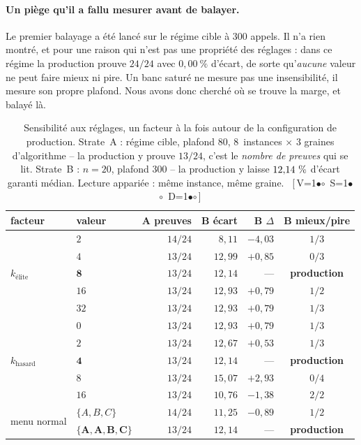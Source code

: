 \documentclass[11pt,a4paper]{article}
\theoremstyle{plain}
\theoremstyle{remark}
\newcommand{\cfgm}[1]{\ifnum#1=1$\bullet$\else$\circ$\fi}
\newcommand{\conf}[3]{%
  \textsf{\footnotesize[\,V\cfgm{#1}\ S\cfgm{#2}\ D\cfgm{#3}\,]}}
\begin{document}
\paragraph{Un piège qu'il a fallu mesurer avant de balayer.} Le premier
balayage a été lancé sur le régime cible à $300$ appels. Il n'a rien montré,
et pour une raison qui n'est pas une propriété des réglages : dans ce régime
la production prouve $24/24$ avec $0{,}00\ \%$ d'écart, de sorte
qu'\emph{aucune} valeur ne peut faire mieux ni pire. Un banc saturé ne
mesure pas une insensibilité, il mesure son propre plafond. Nous avons donc
cherché où se trouve la marge, et balayé là.

\begin{table}[H]
\centering
\caption{Sensibilité aux réglages, un facteur à la fois autour de la
configuration de production. Strate~A : régime cible, plafond $80$,
$8$~instances $\times$ $3$ graines d'algorithme -- la production y prouve
$13/24$, c'est le \emph{nombre de preuves} qui se lit. Strate~B : $n=20$,
plafond $300$ -- la production y laisse $12{,}14{}\ \%$ d'écart garanti
médian. Lecture appariée : même instance, même graine.\ \conf{1}{1}{1}}
\label{tab:sensib}
\setlength{\tabcolsep}{4pt}\small
\begin{tabular}{llrrrc}
\toprule
facteur & valeur & A preuves & B écart & B $\Delta$ & B mieux/pire\\
\midrule
\multirow{5}{*}{$k_{\text{élite}}$}
 & $2$ & $14/24$ & $8{,}11$ & $-4{,}03$ & $1/3$\\
 & $4$ & $13/24$ & $12{,}99$ & $+0{,}85$ & $0/3$\\
 & $\mathbf{8}$ & $13/24$ & $12{,}14$ & --- & \textbf{production}\\
 & $16$ & $13/24$ & $12{,}93$ & $+0{,}79$ & $1/2$\\
 & $32$ & $13/24$ & $12{,}93$ & $+0{,}79$ & $1/3$\\
\midrule
\multirow{5}{*}{$k_{\text{hasard}}$}
 & $0$ & $13/24$ & $12{,}93$ & $+0{,}79$ & $1/3$\\
 & $2$ & $13/24$ & $12{,}67$ & $+0{,}53$ & $1/3$\\
 & $\mathbf{4}$ & $13/24$ & $12{,}14$ & --- & \textbf{production}\\
 & $8$ & $13/24$ & $15{,}07$ & $+2{,}93$ & $0/4$\\
 & $16$ & $13/24$ & $10{,}76$ & $-1{,}38$ & $2/2$\\
\midrule
\multirow{5}{*}{menu normal}
 & $\{A,B,C\}$ & $14/24$ & $11{,}25$ & $-0{,}89$ & $1/2$\\
 & $\mathbf{\{A,A,B,C\}}$ & $13/24$ & $12{,}14$ & --- & \textbf{production}\\

\end{tabular}
\end{table}
\end{document}

